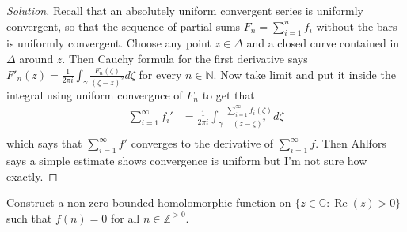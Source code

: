 \begin{proof}[Solution]
	Recall that an absolutely uniform convergent series is uniformly convergent, so that the sequence of partial sums $F_n=\sum_{i=1}^{n} f_i$ without the bars is uniformly convergent. Choose any point $z\in \Delta$ and a closed curve contained in $\Delta$ around $z$. Then Cauchy formula for the first derivative says $F'_{n}(z)=\frac{1}{2\pi i}\int_{\gamma}\frac{F_n(\zeta)}{(\zeta-z)^{2}}d\zeta$ for every $n \in \mathbb{N}$.
	Now take limit and put it inside the integral using uniform convergnce of $F_n$ to get that
	\begin{align*}
	\sum_{i=1}^{\infty} f_i' &=\frac{1}{2\pi i}\int_{\gamma}\frac{\sum_{i=1}^{\infty} f_i(\zeta)}{(z-\zeta)^{2}}d\zeta\\
\end{align*}
which says that $\sum_{i=1}^{\infty} f'$ converges to the derivative of $\sum_{i=1}^{\infty} f$. Then Ahlfors says a simple estimate shows convergence is uniform but I'm not sure how exactly.
\end{proof}

\begin{manualexercise}{2.8}
	Construct a non-zero bounded homolomorphic function on $\{z\in \mathbb{C}:\operatorname{Re}(z)>0\} $ such that $f(n)=0$ for all $n \in \mathbb{Z}^{>0}$.
\end{manualexercise}

